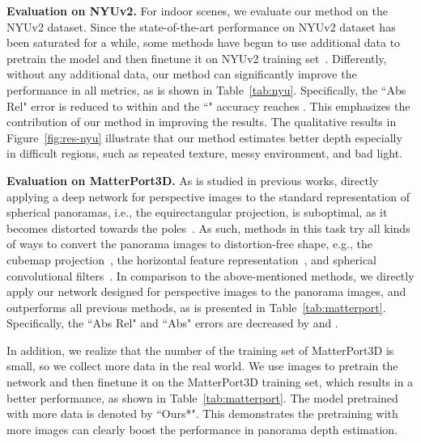 \documentclass[10pt,twocolumn,letterpaper]{article}
\begin{document}
\textbf{Evaluation on NYUv2. }
For indoor scenes, we evaluate our method on the NYUv2 dataset. 
Since the state-of-the-art performance on NYUv2 dataset has been saturated for a while, some methods have begun to use additional data to pretrain the model and then finetune it on NYUv2 training set~\cite{guizilini2021sparse, ranftl2021vision}. 
Differently, without any additional data, our method can significantly improve the performance in all metrics, as is shown in Table~\ref{tab:nyu}. 
Specifically, the ``Abs Rel" error is reduced to within  and the ``" accuracy reaches .
This emphasizes the contribution of our method in improving the results.
The qualitative results in Figure~\ref{fig:res-nyu} illustrate that our method estimates better depth especially in difficult regions, such as repeated texture, messy environment, and bad light.


\textbf{Evaluation on MatterPort3D. }
As is studied in previous works, directly applying a deep network for perspective images to the standard representation of spherical panoramas, i.e., the equirectangular projection, is suboptimal, as it becomes distorted towards the poles~\cite{wang2020bifuse, jiang2021unifuse, sun2021hohonet, tateno2018distortion}. 
As such, methods in this task try all kinds of ways to convert the panorama images to distortion-free shape, e.g., the cubemap projection~\cite{wang2020bifuse, jiang2021unifuse}, the horizontal feature representation~\cite{sun2021hohonet}, and spherical convolutional filters~\cite{tateno2018distortion}.
In comparison to the above-mentioned methods, we directly apply our network designed for perspective images to the panorama images, and outperforms all previous methods, as is presented in Table~\ref{tab:matterport}. Specifically, the ``Abs Rel" and ``Abs" errors are decreased by  and .

In addition, we realize that the number of the training set of MatterPort3D is small, so we collect more data in the real world. We use  images to pretrain the network and then finetune it on the MatterPort3D training set, which results in a better performance, as shown in Table~\ref{tab:matterport}. The model pretrained with more data is denoted by ``Ours*". This demonstrates the pretraining with more images can clearly boost the performance in panorama depth estimation.
\end{document}
